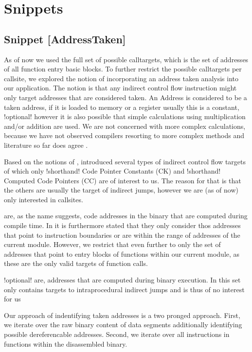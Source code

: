 \part{Snippets} 

\chapter{Snippet [AddressTaken]}

As of now we used the full set of possible calltargets, which is the set of addresses of all function entry basic blocks. To further restrict the possible calltargets per callsite, we explored the notion of incorporating an address taken analysis into our application. The notion is that any indirect control flow instruction might only target addresses that are considered {taken}. An Address is considered to be a {taken} address, if it is loaded to memory or a register usually this is a constant, {!optional! however it is also possible that simple calculations using multiplication and/or addition are used. We are not concerned with more complex calculations, because we have not observed compilers resorting to more complex methods and literature so far does agree \cite{ZhangSekar00}}.

Based on the notions of \cite{ZhangSekar00}, introduced several types of indirect control flow targets of which only {!shorthand! Code Pointer Constants (CK)} and {!shorthand! Computed Code Pointers (CC)} are of interest to us. The reason for that is that the others are usually the target of indirect jumps, however we are (as of now) only interested in callsites.

 { are, as the name suggests, code addresses in the binary that are computed during compile time. In \cite{ZhangSekar00} it is furthermore stated that they only consider thos addresses that point to instruction boundaries or are within the range of addresses of the current module. However, we restrict that even further to only the set of addresses that point to entry blocks of functions within our current module, as these are the only valid targets of function calls. }

{!optional!
 { are, addresses that are computed during binary execution. In \cite{ZhangSekar00}  this set only contains targets to intraprocedural indirect jumps and is thus of no interest for us} }

Our approach of indentifying taken addresses is a two pronged approach. First, we iterate over the raw binary content of data segments additionally identifying possible dereferencable addresses. Second, we iterate over all instructions in functions within the disassembled binary.


